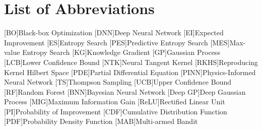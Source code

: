  \noindent


\chapter*{List of Abbreviations}
\begin{multicols}{2}
\begin{acronym}
        [BO]{Black-box Optimization}
        [DNN]{Deep Neural Network}
        [EI]{Expected Improvement}
        [ES]{Entropy Search}
        [PES]{Predictive Entropy Search}
        [MES]{Max-value Entropy Search}
        [KG]{Knowledge Gradient}
        [GP]{Gaussian Process}
        [LCB]{Lower Confidence Bound}
        [NTK]{Neural Tangent Kernel}
        [RKHS]{Reproducing Kernel Hilbert Space}
        [PDE]{Partial Differential Equation}
        [PINN]{Physics-Informed Neural Network}
        [TS]{Thompson Sampling}
        [UCB]{Upper Confidence Bound}
        [RF]{Random Forest}
        [BNN]{Bayesian Neural Network}
        [Deep GP]{Deep Gaussian Process}
        [MIG]{Maximum Information Gain}
        [ReLU]{Rectified Linear Unit}
        [PI]{Probability of Improvement}
        [CDF]{Cumulative Distribution Function}
        [PDF]{Probability Density Function}
        [MAB]{Multi-armed Bandit}
\end{acronym}
\end{multicols}
